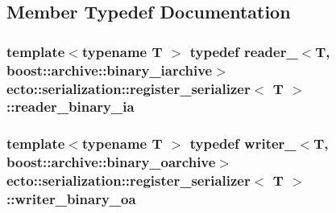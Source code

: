 \subsection{Member Typedef Documentation}
\hypertarget{structecto_1_1serialization_1_1register__serializer_a7783674d19bdb5a7f2143953d6a7302f}{
\subsubsection[{reader\-\_\-binary\-\_\-ia}]{\setlength{\rightskip}{0pt plus 5cm}template$<$typename T $>$ typedef {\bf reader\-\_\-}$<$T, boost\-::archive\-::binary\-\_\-iarchive$>$ {\bf ecto\-::serialization\-::register\-\_\-serializer}$<$ T $>$\-::{\bf reader\-\_\-binary\-\_\-ia}}}\label{structecto_1_1serialization_1_1register__serializer_a7783674d19bdb5a7f2143953d6a7302f}
\hypertarget{structecto_1_1serialization_1_1register__serializer_a31c9f04624076aa209e66232a511c627}{
\subsubsection[{writer\-\_\-binary\-\_\-oa}]{\setlength{\rightskip}{0pt plus 5cm}template$<$typename T $>$ typedef {\bf writer\-\_\-}$<$T, boost\-::archive\-::binary\-\_\-oarchive$>$ {\bf ecto\-::serialization\-::register\-\_\-serializer}$<$ T $>$\-::{\bf writer\-\_\-binary\-\_\-oa}}}\label{structecto_1_1serialization_1_1register__serializer_a31c9f04624076aa209e66232a511c627}


